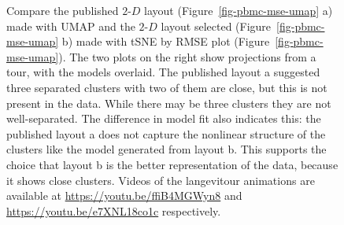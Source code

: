 \documentclass[
  12pt]{article}
\newcommand\gD{$2\text{-}D$}
\begin{document}
\begin{figure}[H]


\caption{\label{fig-model-pbmc-author-proj}Compare the published \gD{}
layout (Figure~\ref{fig-pbmc-mse-umap} a) made with UMAP and the \gD{}
layout selected (Figure~\ref{fig-pbmc-mse-umap} b) made with tSNE by
RMSE plot (Figure~\ref{fig-pbmc-mse-umap}). The two plots on the right
show projections from a tour, with the models overlaid. The published
layout a suggested three separated clusters with two of them are close,
but this is not present in the data. While there may be three clusters
they are not well-separated. The difference in model fit also indicates
this: the published layout a does not capture the nonlinear structure of
the clusters like the model generated from layout b. This supports the
choice that layout b is the better representation of the data, because
it shows close clusters. Videos of the langevitour animations are
available at \url{https://youtu.be/ffiB4MGWyn8} and
\url{https://youtu.be/e7XNL18co1c} respectively.}

\end{figure}%



\end{document}
